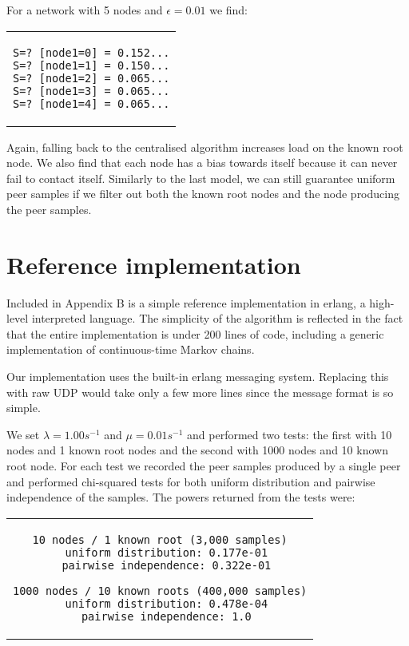 \documentclass[a4paper,10pt]{article}
\newcommand{\code}[1]{
  \footnotesize
  
}
\newcommand{\prismmodel}[1]{
  \begin{quotation}
  \code{../models/#1.sm}
  \end{quotation}
}
\newenvironment{prismprop}[0]{
  \begin{center}
  \begin{tabular}{c}
  \footnotesize
}{
  \end{tabular}
  \end{center}
}
\begin{document}
\prismmodel{ctmc_full_churn}

For a network with 5 nodes and $\epsilon=0.01$ we find:

\begin{prismprop}
\begin{lstlisting}
S=? [node1=0] = 0.152...
S=? [node1=1] = 0.150...
S=? [node1=2] = 0.065...
S=? [node1=3] = 0.065...
S=? [node1=4] = 0.065...
\end{lstlisting}
\end{prismprop}

Again, falling back to the centralised algorithm increases load on the known root node. We also find that each node has a bias towards itself because it can never fail to contact itself. Similarly to the last model, we can still guarantee uniform peer samples if we filter out both the known root nodes and the node producing the peer samples.

\section{Reference implementation}

Included in Appendix B is a simple reference implementation in erlang, a high-level interpreted language. The simplicity of the algorithm is reflected in the fact that the entire implementation is under 200 lines of code, including a generic implementation of continuous-time Markov chains. 

Our implementation uses the built-in erlang messaging system. Replacing this with raw UDP would take only a few more lines since the message format is so simple. 

We set $\lambda=1.00 s^{-1}$ and $\mu=0.01 s^{-1}$ and performed two tests: the first with 10 nodes and 1 known root nodes and the second with 1000 nodes and 10 known root node. For each test we recorded the peer samples produced by a single peer and performed chi-squared tests for both uniform distribution and pairwise independence of the samples. The powers returned from the tests were:

\begin{prismprop}
\begin{lstlisting}
10 nodes / 1 known root (3,000 samples)
  uniform distribution: 0.177e-01
  pairwise independence: 0.322e-01

1000 nodes / 10 known roots (400,000 samples)
  uniform distribution: 0.478e-04
  pairwise independence: 1.0
\end{lstlisting}
\end{prismprop}
\end{document}
